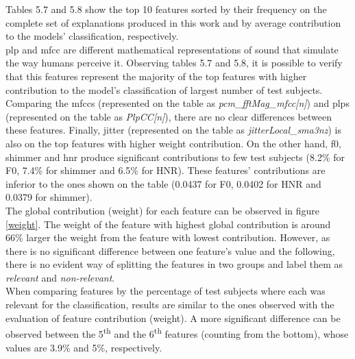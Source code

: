 Tables 5.7 and 5.8 show the top 10 features sorted by their frequency on the complete set of explanations produced in this work and by average contribution to the models' classification, respectively. \\
\gls{plp} and \gls{mfcc} are different mathematical representations of sound that simulate the way humans perceive it. Observing tables 5.7 and 5.8, it is possible to verify that this features represent the majority of the top features with higher contribution to the model's classification of largest number of test subjects. Comparing the \gls{mfcc}s (represented on the table as \textit{pcm\_fftMag\_mfcc[n]}) and \gls{plp}s (represented on the table as \textit{PlpCC[n]}), there are no clear differences between these features. Finally, jitter (represented on the table as \textit{jitterLocal\_sma3nz}) is also on the top features with higher weight contribution. On the other hand, \gls{f0}, shimmer and \gls{hnr} produce significant contributions to few test subjects (8.2\% for F0, 7.4\% for shimmer and 6.5\% for HNR). These features' contributions are inferior to the ones shown on the table (0.0437 for F0, 0.0402 for HNR and 0.0379 for shimmer). \\
The global contribution (weight) for each feature can be observed in figure \ref{weight}. The weight of the feature with highest global contribution is around 66\% larger the weight from the feature with lowest contribution. However, as there is no significant difference between one feature's value and the following, there is no evident way of splitting the features in two groups and label them as \textit{relevant} and \textit{non-relevant}. \\
When comparing features by the percentage of test subjects where each was relevant for the classification, results are similar to the ones observed with the evaluation of feature contribution (weight). A more significant difference can be observed between the 5\textsuperscript{th} and the 6\textsuperscript{th} features (counting from the bottom), whose values are 3.9\% and 5\%, respectively.

